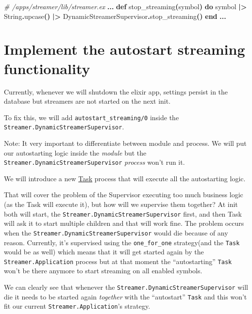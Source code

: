 \documentclass[
  oneside]{book}
\newenvironment{Shaded}{\begin{snugshade}}{\end{snugshade}}
\newcommand{\CommentTok}[1]{\textcolor[rgb]{0.56,0.35,0.01}{\textit{#1}}}
\newcommand{\ConstantTok}[1]{\textcolor[rgb]{0.56,0.35,0.01}{#1}}
\newcommand{\FunctionTok}[1]{\textcolor[rgb]{0.13,0.29,0.53}{\textbf{#1}}}
\newcommand{\KeywordTok}[1]{\textcolor[rgb]{0.13,0.29,0.53}{\textbf{#1}}}
\newcommand{\NormalTok}[1]{#1}
\newcommand{\OperatorTok}[1]{\textcolor[rgb]{0.81,0.36,0.00}{\textbf{#1}}}
\begin{document}
\begin{Shaded}
\begin{Highlighting}[]
\CommentTok{\# /apps/streamer/lib/streamer.ex}
  \OperatorTok{...}
  \KeywordTok{def}\NormalTok{ stop\_streaming}\FunctionTok{(}\NormalTok{symbol}\FunctionTok{)} \KeywordTok{do}
\NormalTok{    symbol}
    \OperatorTok{|\textgreater{}} \ConstantTok{String}\OperatorTok{.}\NormalTok{upcase}\FunctionTok{()}
    \OperatorTok{|\textgreater{}} \ConstantTok{DynamicStreamerSupervisor}\OperatorTok{.}\NormalTok{stop\_streaming}\FunctionTok{()}
  \KeywordTok{end}
  \OperatorTok{...}
\end{Highlighting}
\end{Shaded}

\section{Implement the autostart streaming functionality}\label{implement-the-autostart-streaming-functionality}

Currently, whenever we will shutdown the elixir app, settings persist in the database but streamers are not started on the next init.

To fix this, we will add \texttt{autostart\_streaming/0} inside the \texttt{Streamer.DynamicStreamerSupervisor}.

Note: It very important to differentiate between module and process. We will put our autostarting logic inside the \emph{module} but the \texttt{Streamer.DynamicStreamerSupervisor} \emph{process} won't run it.

We will introduce a new \href{https://hexdocs.pm/elixir/master/Task.html}{Task} process that will execute all the autostarting logic.

That will cover the problem of the Supervisor executing too much business logic (as the Task will execute it), but how will we supervise them together?
At init both will start, the \texttt{Streamer.DynamicStreamerSupervisor} first, and then Task will ask it to start multiple children and that will work fine. The problem occurs when the \texttt{Streamer.DynamicStreamerSupervisor} would die because of any reason. Currently, it's supervised using the \texttt{one\_for\_one} strategy(and the \texttt{Task} would be as well) which means that it will get started again by the \texttt{Streamer.Application} process but at that moment the ``autostarting'' \texttt{Task} won't be there anymore to start streaming on all enabled symbols.

We can clearly see that whenever the \texttt{Streamer.DynamicStreamerSupervisor} will die it needs to be started again \emph{together} with the ``autostart'' \texttt{Task} and this won't fit our current \texttt{Streamer.Application}'s strategy.
\end{document}

